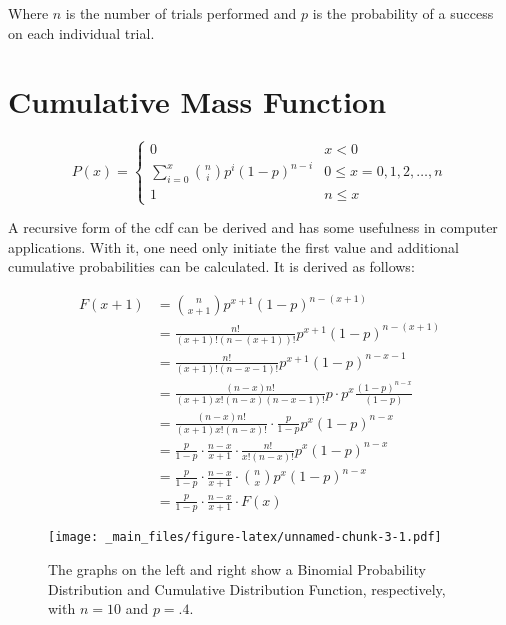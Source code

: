 \documentclass[]{book}
\begin{document}
Where \(n\) is the number of trials performed and \(p\) is the
probability of a success on each individual trial.

\section{Cumulative Mass Function}\label{cumulative-mass-function-1}

\[ P(x)=
    \left\{
        \begin{array} {lll}
            0                           & x<0\\
            \sum\limits_{i=0}^{x} {n \choose i} p^i (1-p)^{n-i}     & 0 \leq x=0,1,2,\ldots,n\\
            1                           & n\leq x
        \end{array}
    \right. \]

A recursive form of the cdf can be derived and has some usefulness in
computer applications. With it, one need only initiate the first value
and additional cumulative probabilities can be calculated. It is derived
as follows:

\[\begin{align*} 
F(x+1)
    &= {n\choose x+1} p^{x+1} (1-p)^{n-(x+1)} \\
    &= \frac{n!}{(x+1)!(n-(x+1))!} p^{x+1} (1-p)^{n-(x+1)} \\
  &= \frac{n!}{(x+1)!(n-x-1)!} p^{x+1} (1-p)^{n-x-1} \\
  &= \frac{(n-x)n!}{(x+1)x!(n-x)(n-x-1)!} p \cdot p^x \frac{(1-p)^{n-x}}{(1-p)} \\
  &= \frac{(n-x)n!}{(x+1)x!(n-x)!} \cdot \frac{p}{1-p} p^x (1-p)^{n-x} \\
  &= \frac{p}{1-p} \cdot \frac{n-x}{x+1} \cdot \frac{n!}{x!(n-x)!} p^x (1-p)^{n-x} \\
  &= \frac{p}{1-p} \cdot \frac{n-x}{x+1} \cdot {n\choose x} p^x (1-p)^{n-x} \\
    &= \frac{p}{1-p} \cdot \frac{n-x}{x+1} \cdot F(x)
\end{align*}\]

\begin{figure}[htbp]
\centering
\texttt{[image: \_main\_files/figure-latex/unnamed-chunk-3-1.pdf]}
\caption{\label{fig:unnamed-chunk-3}The graphs on the left and right show a
Binomial Probability Distribution and Cumulative Distribution Function,
respectively, with \(n=10\) and \(p=.4\).}
\end{figure}
\end{document}
